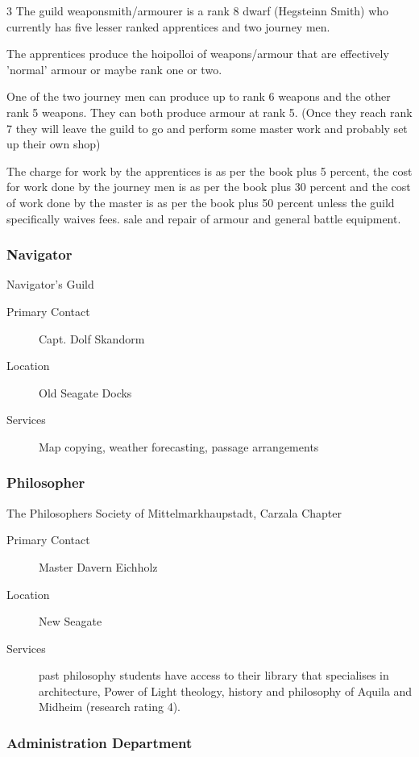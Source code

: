 \begin{multicols}{3}
The guild weaponsmith/armourer is a rank 8 dwarf (Hegsteinn Smith) who
currently has five lesser ranked apprentices and two journey men.

The apprentices produce the hoipolloi of weapons/armour that are
effectively 'normal' armour or maybe rank one or two.

One of the two journey men can produce up to rank 6 weapons and the
other rank 5 weapons. They can both produce armour at rank 5. (Once
they reach rank 7 they will leave the guild to go and perform some
master work and probably set up their own shop)

The charge for work by the apprentices is as per the book plus 5
percent, the cost for work done by the journey men is as per the book
plus 30 percent and the cost of work done by the master is as per the
book plus 50 percent unless the guild specifically waives fees.  sale
and repair of armour and general battle equipment.

\subsubsection{Navigator}

Navigator’s Guild

\begin{description}
\item[Primary Contact] Capt. Dolf Skandorm
\item[Location] Old Seagate Docks
\item[Services] Map copying, weather forecasting,
passage arrangements
\end{description}

\subsubsection{Philosopher}

The Philosophers Society of Mittelmarkhaupstadt, Carzala Chapter

\begin{description}
\item[Primary Contact] Master Davern Eichholz
\item[Location] New Seagate
\item[Services] past philosophy students have access to their library
  that specialises in architecture, Power of Light theology, history
  and philosophy of Aquila and Midheim (research rating 4).
\end{description}

\subsubsection{Administration Department}


\end{multicols}
